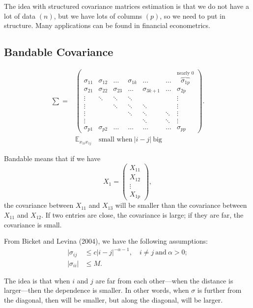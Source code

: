 \documentclass[twoside]{article}
\theoremstyle{definition}
\theoremstyle{definition}
\theoremstyle{remark}
\def\X{{\mathcal X}}
\begin{document}
The idea with structured covariance matrices estimation is that we do not have a lot of data $(n)$, but we have lots of columns $(p)$, so we need to put in structure. Many applications can be found in financial econometrics.

\subsection{Bandable Covariance}

\[
\begin{aligned}
\sum = &\begin{pmatrix}
\sigma_{11} & \sigma_{12} & \ldots & \sigma_{1k} & \ldots & \ldots & \overbrace{\sigma_{1p}}^\text{nearly 0} \\
\sigma_{21} & \sigma_{22} & \sigma_{23} & \ldots & \sigma_{3k+1} & \ldots & \sigma_{2p} \\
\vdots &  \ddots & \ddots & \ddots & & & \vdots \\
\vdots & &  \ddots & \ddots & \ddots & & \vdots \\
\vdots & & &  \ddots &  \ddots & \ddots & \vdots \\
\vdots & & & &  \ddots &  \ddots & \vdots \\
\sigma_{p1} & \sigma_{p2} & \ldots & \ldots & \ldots & \ldots & \sigma_{pp}
\end{pmatrix}. \\
&\mathbb{E}_{x_{1i}x_{1j}} \quad \text{small when} \ |i-j| \ \text{big}
\end{aligned}
\]

Bandable means that if we have
\[
 X_1 = \left(\begin{smallmatrix} X_{11} \\ X_{12} \\ \vdots \\X_{1p} \end{smallmatrix}\right),
\]
the covariance between $X_{11}$ and $X_{13}$ will be smaller than the covariance between $X_{11}$ and $X_{12}$. If two entries are close, the covariance is large; if they are far, the covariance is small.

From Bicket and Levina (2004), we have the following assumptions:
\[
\begin{aligned}
| \sigma_{ij} &\leq c |i-j|^{-\alpha - 1}, \quad i \not= j \ \text{and} \ \alpha >0; \\
| \sigma_{ii} | &\leq M.
\end{aligned}
\]

The idea is that when $i$ and $j$ are far from each other—when the distance is larger—then the dependence is smaller. In other words, when $\sigma$ is further from the diagonal, then will be smaller, but along the diagonal, will be larger.
\end{document}
